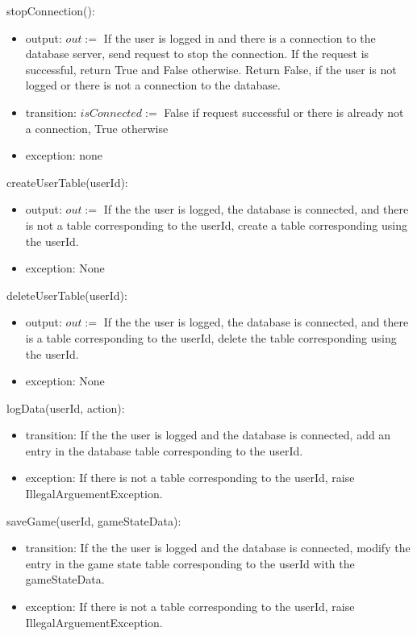 \documentclass[12pt, titlepage]{article}
\begin{document}
\noindent stopConnection():
\begin{itemize}
\item output: $out := $ If the user is logged in and there is a connection to the database server, send request to stop the connection. If the request is successful, return True and False otherwise. Return False, if the user is not logged or there is not a connection to the database.
\item transition: $isConnected := $ False if request successful or there is already not a connection, True otherwise
\item exception: none
\end{itemize}

\noindent createUserTable(userId):
\begin{itemize}
\item output: $out := $ If the the user is logged, the database is connected, and there is not a table corresponding to the userId, create a table corresponding using the userId.
\item exception: None
\end{itemize}

\noindent deleteUserTable(userId):
\begin{itemize}
\item output: $out := $ If the the user is logged, the database is connected, and there is a table corresponding to the userId, delete the table corresponding using the userId.
\item exception: None
\end{itemize}

\noindent logData(userId, action):
\begin{itemize}
\item transition: If the the user is logged and the database is connected, add an entry in the database table corresponding to the userId.
\item exception: If there is not a table corresponding to the userId, raise IllegalArguementException.
\end{itemize}

\noindent saveGame(userId, gameStateData):
\begin{itemize}
\item transition: If the the user is logged and the database is connected, modify the entry in the game state table corresponding to the userId with the gameStateData.
\item exception: If there is not a table corresponding to the userId, raise IllegalArguementException.
\end{itemize}
\end{document}
